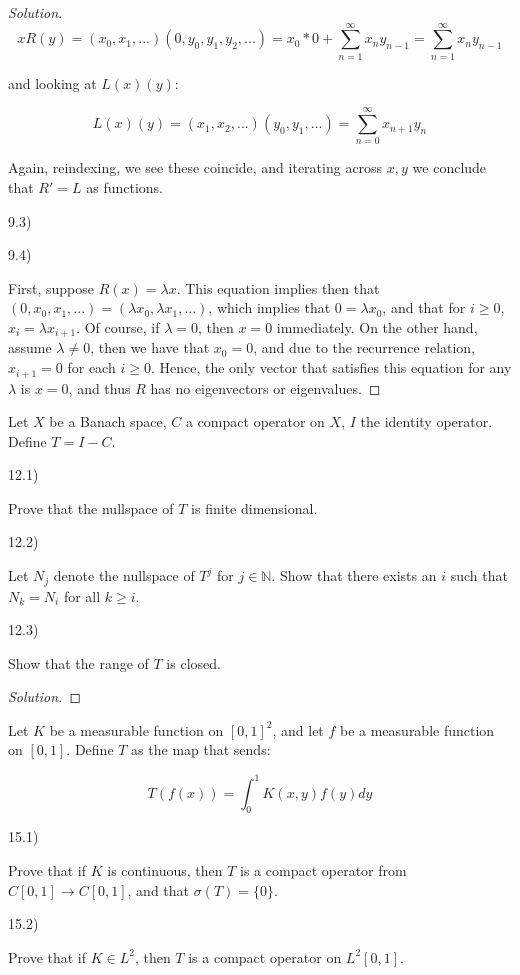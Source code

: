 \documentclass[10pt]{article}
\newenvironment{problem}[2][]{\begin{trivlist}
\item[\hskip \labelsep {\bfseries #1}\hskip \labelsep {\bfseries #2.}]}{\end{trivlist}}
\begin{document}
\begin{proof}[Solution]
$$ x R(y) =(x_0,x_1,...)(0,y_0,y_1,y_2,...) = x_0 * 0 +  \sum_{n=1}^\infty x_n y_{n-1} = \sum_{n=1}^\infty x_n y_{n-1} $$

and looking at $L(x)(y)$:

$$ L(x)(y) = (x_1,x_2,...)(y_0,y_1,...) = \sum_{n=0}^\infty x_{n+1}y_n $$

Again, reindexing, we see these coincide, and iterating across $x, y$ we conclude that $R' = L$ as functions.

9.3)

9.4)

First, suppose $R(x) =\lambda x$. This equation implies then that $(0,x_0,x_1,...) = (\lambda x_0, \lambda x_1,...)$, which implies that $0 =\lambda  x_0$, and that for $ i \geq 0$, $x_i = \lambda x_{i+1}$. Of course, if $\lambda = 0$, then $x = 0$ immediately. On the other hand, assume $\lambda \not = 0$, then we have that $x_0 = 0$, and due to the recurrence relation, $x_{i+1} = 0$ for each $i \geq 0$. Hence, the only vector that satisfies this equation for any $\lambda$ is $x = 0$, and thus $R$ has no eigenvectors or eigenvalues.

\end{proof}

\begin{problem}{Question 12}

Let $X$ be a Banach space, $C$ a compact operator on $X$, $I$ the identity operator. Define $T = I - C$.

12.1)

Prove that the nullspace of $T$ is finite dimensional.

12.2)

Let $N_j$ denote the nullspace of $T^j$ for $j \in \mathbb{N}$. Show that there exists an $i$ such that $N_k = N_i$ for all $k \geq i$. 

12.3)

Show that the range of $T$ is closed.

\end{problem}

\begin{proof}[Solution]


\end{proof}


\begin{problem}{Question 15}

Let $K$ be a measurable function on $[0,1]^2$, and let $f$ be a measurable function on $[0,1]$. Define $T$ as the map that sends:

$$ T(f(x)) = \int_0^1 K(x,y)f(y) dy $$

15.1)

Prove that if $K$ is continuous, then $T$ is a compact operator from $C[0,1] \to C[0,1]$, and that $\sigma(T) = \{ 0 \}$.

15.2)

Prove that if $K \in L^2$, then $T$ is a compact operator on $L^2[0,1]$.

\end{problem}
\end{document}
